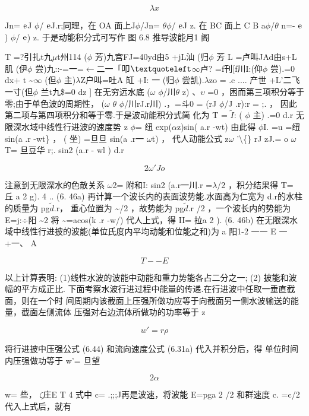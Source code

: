 \[\lambda x\]

Jn= ${\rm e}$J $\phi$/ ${\rm e}$J.r;同理，在 OA 面上J$\phi$/Jn= $\theta$$\phi$/ ${\rm e}$J z. 在 BC 面上 C B a$\phi$/$\theta$ n=- ${\rm e}$) $\phi$/ ${\rm e}$) z. 于是动能积分式可写作 图 6.8 推导波能月1 阁

T =?引扎t九$\mu$t州114 ($\phi$ 芳)九宫FJ=40yd由5 +jL汕 (归$\phi$ 芳 L =卢叫JAd由s+L肌 (伊$\phi$ 尝)九::-=一=$\leftarrow$二一「叩${\rm ‘}$$\infty$卢? =f刊[f川I:(仰$\phi$ 尝).=0 dx+ t \textasciitilde{}$\infty$ (但$\phi$ 主)$\lambda$Z户叫=吐A 缸 +I: 一 (归$\phi$ 尝凯).$\lambda$zo = .c .... 产世 +L'二飞一寸(但$\phi$ 兰t九\$=0 dz ] 在无穷远水底 ($\omega$ $\phi$/川$\theta$ z) 、$\upsilon$ =0 ，困而第三项积分等于零;由于单色波的周期性， ($\omega$ $\theta$ $\phi$/川rJ.r川) .，=斗0 = (rJ $\phi$/J .r):r = ;. ， 因此第二项与第四项积分和等于零.于是波动能积分式简 化为 T = $\tilde{I}$: ( $\phi$ 主) .=0 d.r 无限深水域中线性行进波的速度势 z $\phi$= 纽 exp($\alpha$z)sin( a.r -wt) 由此得 $\phi$I. =u =纽 sin(a .r -wt\} ， ( 坐) =旦旦 sin(a .r一 $\omega$t) ， 代人动能公式 z$\omega$ '\textbackslash\{\} rJ zJ.= o $\omega$ T= 旦豆华 r;. sin2 (a.r - wl ) d.r

\[2\omega  ' Jo\]

注意到无限深水的色散关系 $\omega$2= 附和I: sin2 (a.r一川.r =$\lambda$/2 ，积分结果得 T= 丘 a 2 g). 4 .. (6. 46a) 再计算一个波长内的表面波势能.水面高为仁宽为 d.r的水柱的质量为 pg$\tilde{d}$.r， 重心位置为 \textasciitilde{}/2 ，故势能为 pg$\tilde{d}$.r /2 ，一个波长内的势能为 E=j:$\div$阳 \textasciitilde{}2 将 \textasciitilde{}=acos(k .r -w/) 代人上式，得 II= 拉a 2 ). (6. 46b) 在无限深水域中线性行进披的波能(单位氏度内平均动能和位能之和)为 a 阳1-2 一一 E 一 +一、 A

\begin{equation*}T--E\tag{6.47}\end{equation*}

以上计算表明: (1)线性水波的波能中动能和重力势能各占二分之一; (2) 披能和波 幅的平方成正比. 下面考察水波行进过程中能量的传递.在行进波中任取一垂直截面，则在一个时 间周期内该截面上压强所做功应等于向截面另一侧水波输送的能量，截面左侧流体 压强对右边流体所做功的功率等于 z

\[w'= r\rho \]

将行进披中压强公式 (6.44) 和流向速度公式 (6.31a) 代入并积分后，得 单位时间内压强做功等于 w'= 旦望

\[2\alpha \]

w= 些， $\zeta$庄E T 4 式中 c= .;;;J再是波速，将波能 E=pga 2 /2 和群速度 c. =c/2 代入上式后，就有

